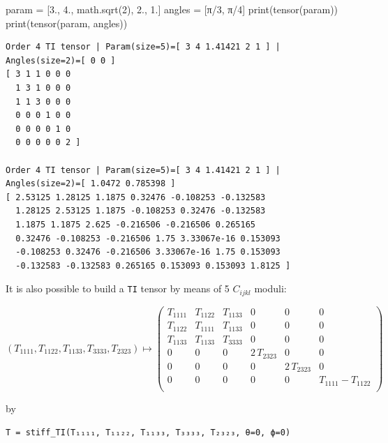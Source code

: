 \documentclass[
  letterpaper,
  DIV=11,
  numbers=noendperiod]{scrreprt}
\newenvironment{Shaded}{\begin{snugshade}}{\end{snugshade}}
\newcommand{\BuiltInTok}[1]{\textcolor[rgb]{0.00,0.23,0.31}{#1}}
\newcommand{\DecValTok}[1]{\textcolor[rgb]{0.68,0.00,0.00}{#1}}
\newcommand{\FloatTok}[1]{\textcolor[rgb]{0.68,0.00,0.00}{#1}}
\newcommand{\NormalTok}[1]{\textcolor[rgb]{0.00,0.23,0.31}{#1}}
\newcommand{\OperatorTok}[1]{\textcolor[rgb]{0.37,0.37,0.37}{#1}}
\begin{document}
\begin{Shaded}
\begin{Highlighting}[]
\NormalTok{param }\OperatorTok{=}\NormalTok{ [}\FloatTok{3.}\NormalTok{, }\FloatTok{4.}\NormalTok{, math.sqrt(}\DecValTok{2}\NormalTok{), }\FloatTok{2.}\NormalTok{, }\FloatTok{1.}\NormalTok{]}
\NormalTok{angles }\OperatorTok{=}\NormalTok{ [π}\OperatorTok{/}\DecValTok{3}\NormalTok{, π}\OperatorTok{/}\DecValTok{4}\NormalTok{]}
\BuiltInTok{print}\NormalTok{(tensor(param))}
\BuiltInTok{print}\NormalTok{(tensor(param, angles))}
\end{Highlighting}
\end{Shaded}

\begin{verbatim}
Order 4 TI tensor | Param(size=5)=[ 3 4 1.41421 2 1 ] | Angles(size=2)=[ 0 0 ]
[ 3 1 1 0 0 0 
  1 3 1 0 0 0 
  1 1 3 0 0 0 
  0 0 0 1 0 0 
  0 0 0 0 1 0 
  0 0 0 0 0 2 ]

Order 4 TI tensor | Param(size=5)=[ 3 4 1.41421 2 1 ] | Angles(size=2)=[ 1.0472 0.785398 ]
[ 2.53125 1.28125 1.1875 0.32476 -0.108253 -0.132583 
  1.28125 2.53125 1.1875 -0.108253 0.32476 -0.132583 
  1.1875 1.1875 2.625 -0.216506 -0.216506 0.265165 
  0.32476 -0.108253 -0.216506 1.75 3.33067e-16 0.153093 
  -0.108253 0.32476 -0.216506 3.33067e-16 1.75 0.153093 
  -0.132583 -0.132583 0.265165 0.153093 0.153093 1.8125 ]
\end{verbatim}

It is also possible to build a \texttt{TI} tensor by means of 5
\(C_{ijkl}\) moduli:

\[
(T_{1 1 1 1}, T_{1 1 2 2}, T_{1 1 3 3}, T_{3 3 3 3}, T_{2 3 2 3})
\mapsto
\left(
\begin{array}{cccccc}
T_{1 1 1 1} & T_{1 1 2 2} & T_{1 1 3 3} & 0 & 0 & 0 \\
T_{1 1 2 2} & T_{1 1 1 1} & T_{1 1 3 3} & 0 & 0 & 0 \\
T_{1 1 3 3} & T_{1 1 3 3} & T_{3 3 3 3} & 0 & 0 & 0 \\
0 & 0 & 0 & 2 \, T_{2 3 2 3} & 0 & 0 \\
0 & 0 & 0 & 0 & 2 \, T_{2 3 2 3} & 0 \\
0 & 0 & 0 & 0 & 0 & T_{1 1 1 1} - T_{1 1 2 2} \\
\end{array}
\right)
\]

by

\texttt{T\ =\ stiff\_TI(T₁₁₁₁,\ T₁₁₂₂,\ T₁₁₃₃,\ T₃₃₃₃,\ T₂₃₂₃,\ θ=0,\ ϕ=0)}
\end{document}
